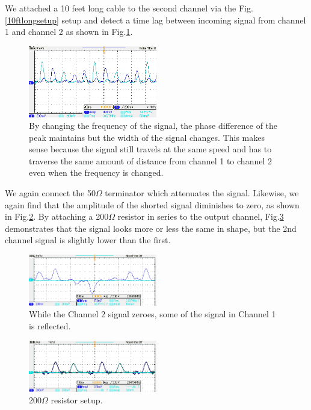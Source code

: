 \documentclass[authoryear, 12pt,5p, times]{elsarticle}
\begin{document}
We attached a 10 feet long cable  to the second channel via the Fig. \ref{10ftlongsetup} setup and  detect a time lag between incoming signal from channel 1 and channel 2 as shown in Fig.\ref{timelag1}. 
\begin{figure}[h!]
\includegraphics[width=0.5\textwidth]{figure/2_13_timelag_setup}
\caption{By changing the frequency of the signal, the phase difference of the peak maintains but the width of the signal changes. This makes sense because the signal still travels at the same speed and has to traverse the same amount of distance from channel 1 to channel 2 even when the frequency is changed.}
\label{timelag1}
\end{figure}
We again connect the 50$\Omega$ terminator which attenuates the signal. Likewise, we again find that the amplitude of the shorted signal diminishes to zero, as shown in Fig.\ref{shorted2}. By attaching a 200$\Omega$ resistor in series to the output channel, Fig.\ref{2_13_50ohmR} demonstrates that the signal looks more or less the same in shape, but the 2nd channel signal is slightly lower than the first.
\begin{figure}[h!]
\includegraphics[width=0.5\textwidth]{figure/2_13_shorted}
\caption{While the Channel 2 signal zeroes, some of the signal in Channel 1 is reflected.}
\label{shorted2}
\end{figure}
\begin{figure}[h!]
\includegraphics[width=0.5\textwidth]{figure/2_13_50ohmR}
\caption{200$\Omega$ resistor setup.}
\label{2_13_50ohmR}
\end{figure}
\end{document}

